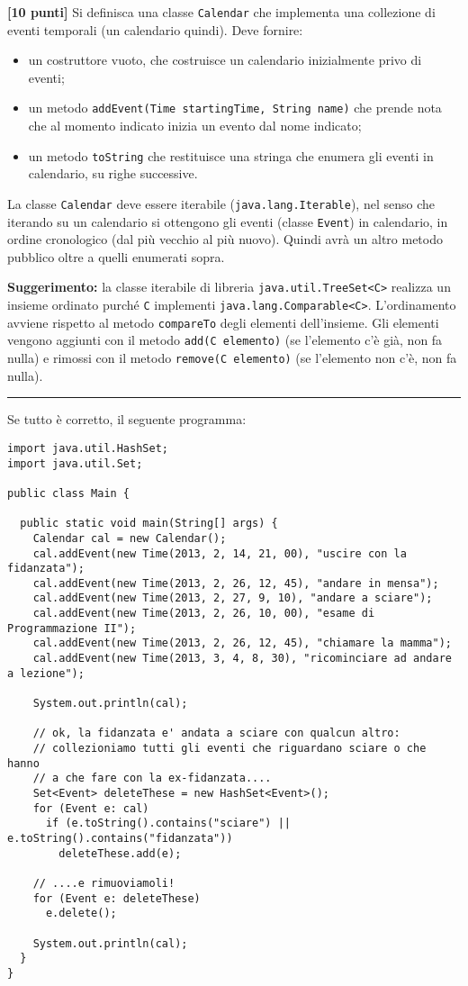 \documentclass{article}[10pt]
\newcounter{esnu}
\newenvironment{esercizio}{\medskip \noindent {\bf Esercizio\addtocounter{esnu}{1} \arabic{esnu}}}{}
\begin{document}
\begin{esercizio}
\textbf{[10 punti]}
Si definisca una classe \texttt{Calendar} che implementa una collezione di eventi
temporali (un calendario quindi). Deve fornire:
%
\begin{itemize}
\item un costruttore vuoto, che costruisce un calendario inizialmente privo di eventi;
\item un metodo \texttt{addEvent(Time startingTime, String name)} che prende nota
      che al momento indicato inizia un evento dal nome indicato;
\item un metodo \texttt{toString} che restituisce una stringa che enumera gli
      eventi in calendario, su righe successive.
\end{itemize}
%
La classe \texttt{Calendar} deve essere iterabile (\texttt{java.lang.Iterable}), nel senso che
iterando su un calendario si ottengono gli eventi (classe \texttt{Event})
in calendario, in ordine
cronologico (dal pi\`u vecchio al pi\`u nuovo). Quindi avr\`a un altro
metodo pubblico oltre a quelli enumerati sopra.

\textbf{Suggerimento: } la classe iterabile di libreria
\texttt{java.util.TreeSet<C>} realizza un insieme
ordinato purch\'e \texttt{C} implementi \texttt{java.lang.Comparable<C>}.
L'ordinamento avviene rispetto al metodo \texttt{compareTo} degli elementi
dell'insieme. Gli elementi vengono aggiunti con il metodo
\texttt{add(C elemento)} (se l'elemento c'\`e gi\`a, non fa nulla)
e rimossi con il metodo
\texttt{remove(C elemento)} (se l'elemento non c'\`e, non fa nulla).
\end{esercizio}

\vspace*{3ex}
\hrule
\vspace*{3ex}
Se tutto \`e corretto, il seguente programma:
%
{\small
\begin{verbatim}
import java.util.HashSet;
import java.util.Set;

public class Main {

  public static void main(String[] args) {
    Calendar cal = new Calendar();
    cal.addEvent(new Time(2013, 2, 14, 21, 00), "uscire con la fidanzata");
    cal.addEvent(new Time(2013, 2, 26, 12, 45), "andare in mensa");
    cal.addEvent(new Time(2013, 2, 27, 9, 10), "andare a sciare");
    cal.addEvent(new Time(2013, 2, 26, 10, 00), "esame di Programmazione II");
    cal.addEvent(new Time(2013, 2, 26, 12, 45), "chiamare la mamma");
    cal.addEvent(new Time(2013, 3, 4, 8, 30), "ricominciare ad andare a lezione");

    System.out.println(cal);

    // ok, la fidanzata e' andata a sciare con qualcun altro:
    // collezioniamo tutti gli eventi che riguardano sciare o che hanno
    // a che fare con la ex-fidanzata....
    Set<Event> deleteThese = new HashSet<Event>();
    for (Event e: cal)
      if (e.toString().contains("sciare") || e.toString().contains("fidanzata"))
        deleteThese.add(e);

    // ....e rimuoviamoli!
    for (Event e: deleteThese)
      e.delete();

    System.out.println(cal);
  }
}
\end{verbatim}}
\end{document}
